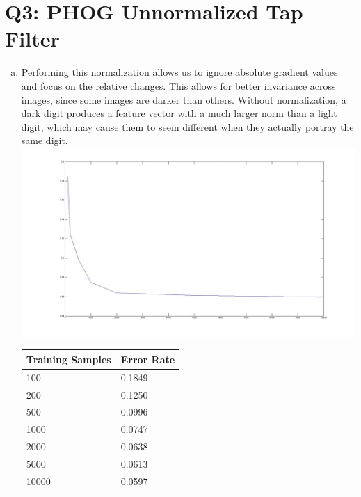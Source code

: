 \documentclass[12pt]{article}
\begin{document}
\section*{Q3: PHOG Unnormalized Tap Filter}
  \begin{enumerate}[c.]
    \item Performing this normalization allows us to ignore absolute gradient
      values and focus on the relative changes. This allows for better
      invariance across images, since some images are darker than
      others. Without normalization, a dark digit produces a feature vector with
      a much larger norm than a light digit, which may cause them to seem
      different when they actually portray the same digit. \\
      \includegraphics[scale=0.3]{q3_unnormalized.jpg}
      \begin{tabular}{l|l}
        \hline
        Training Samples & Error Rate \\
        \hline
        100   & 0.1849 \\
        200   & 0.1250 \\
        500   & 0.0996 \\
        1000  & 0.0747 \\
        2000  & 0.0638 \\
        5000  & 0.0613 \\
        10000 & 0.0597 \\
      \end{tabular}
  \end{enumerate}

\newpage
\end{document}
